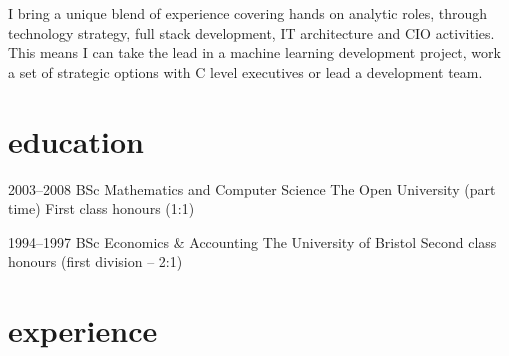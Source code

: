 \documentclass[]{friggeri-cv-a4}
\begin{document}
I bring a unique blend of experience covering hands on analytic roles, through technology strategy, full stack development, IT architecture and CIO activities.  This means I can take the lead in a machine learning development project, work a set of strategic options with C level executives or lead a development team.



\section{education}

\begin{entrylist}


\entry
{2003--2008}
{BSc {\normalfont Mathematics and Computer Science}}
{The Open University (part time)}
{First class honours (1:1)}


\entry
{1994--1997}
{BSc {\normalfont Economics \& Accounting}}
{The University of Bristol}
{Second class honours (first division -- 2:1)}


\end{entrylist}


\section{experience}

\end{document}
